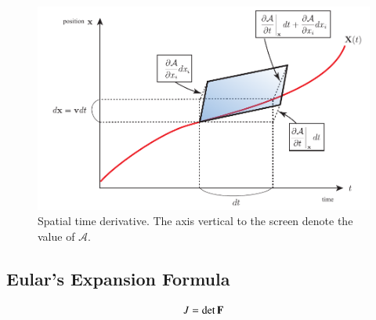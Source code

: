 \begin{figure}[htbp!]
\centering
\includegraphics[width=160mm]{images/space_time_derivative.pdf}
\caption{Spatial time derivative. The axis vertical to the screen denote the value of $\mathcal{A}$.  }
\end{figure}  




\subsection{Eular's Expansion Formula}

\begin{eqnarray}
J = \det\mathbf{F}
\end{eqnarray}

